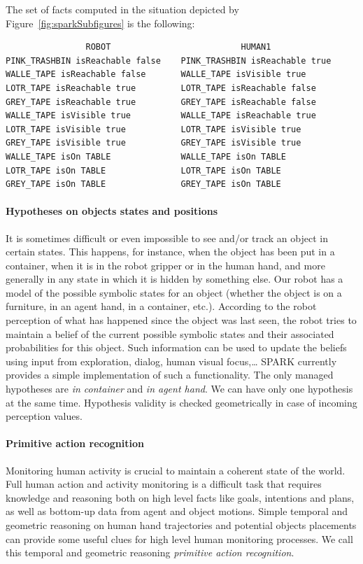 \documentclass[preprint,5p]{elsarticle}
\begin{document}
The set of facts computed in the situation depicted by
Figure~\ref{fig:sparkSubfigures} is the following:
\begin{footnotesize}
\begin{verbatim}
                ROBOT                          HUMAN1
PINK_TRASHBIN isReachable false    PINK_TRASHBIN isReachable true 
WALLE_TAPE isReachable false       WALLE_TAPE isVisible true 
LOTR_TAPE isReachable true         LOTR_TAPE isReachable false 
GREY_TAPE isReachable true         GREY_TAPE isReachable false
WALLE_TAPE isVisible true          WALLE_TAPE isReachable true 
LOTR_TAPE isVisible true           LOTR_TAPE isVisible true 
GREY_TAPE isVisible true           GREY_TAPE isVisible true 
WALLE_TAPE isOn TABLE              WALLE_TAPE isOn TABLE 
LOTR_TAPE isOn TABLE               LOTR_TAPE isOn TABLE 
GREY_TAPE isOn TABLE               GREY_TAPE isOn TABLE 
\end{verbatim}
\end{footnotesize}

\paragraph{Hypotheses on objects states and positions}
It is sometimes difficult or even impossible to see and/or track an
object in certain states. This happens, for instance, when the object
has been put in a container, when it is in the robot gripper or in the
human hand, and more generally in any state in which it is hidden by
something else. Our robot has a model of the possible symbolic states
for an object (whether the object is on a furniture, in an agent hand,
in a container, etc.).  According to the robot perception of what has
happened since the object was last seen, the robot tries to maintain a
belief of the current possible symbolic states and their associated
probabilities for this object. Such information can be used to update
the beliefs using input from exploration, dialog, human visual
focus,\ldots
SPARK currently provides a simple implementation of such a functionality. The
only managed hypotheses are \emph{in container} and \emph{in agent hand}. We
can have only one hypothesis at the same time. Hypothesis validity is checked
geometrically in case of incoming perception values.


\paragraph{Primitive action recognition}
Monitoring human activity is crucial to maintain a coherent state of
the world. Full human action and activity monitoring is a difficult
task that requires knowledge and reasoning both on high level facts
like goals, intentions and plans, as well as bottom-up data from agent
and object motions. Simple temporal and geometric reasoning on human
hand trajectories and potential objects placements can provide some
useful clues for high level human monitoring processes. We call this
temporal and geometric reasoning \emph{primitive action recognition}.
\end{document}
